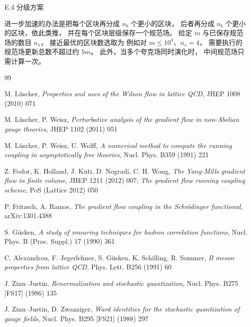 \lussubsec E.4 分级方案

进一步加速的办法是把每个区块再分成 $n_b$ 个更小的区块，
后者再分成 $n_b$ 个更小的区块，依此类推，
并在每个区块层级保存一个规范场。
给定 $m$ 与已保存规范场的数目 $n_s$，
接近最优的区块数选取为
例如对 $m\leq10^3$、$n_s=4$，
需要执行的规范场更新总数不超过约 $5m$。
此外，当多个夸克场同时演化时，
中间规范场只需计算一次。

\begin{thebibliography}{99}




M. L\"uscher,
{\it Properties and uses of the Wilson flow in lattice QCD},
JHEP 1008 (2010) 071



M. L\"uscher, P. Weisz,
{\it Perturbative analysis of the gradient flow in non-Abelian gauge
theories},
JHEP 1102 (2011) 051



M. L\"uscher, P. Weisz, U. Wolff,
{\it A numerical method to compute the running coupling in asymptotically 
free theories},
Nucl. Phys. B359 (1991) 221

Z. Fodor, K. Holland, J. Kuti, D. Nogradi, C. H. Wong,
{\it The Yang-Mills gradient flow in finite volume},
JHEP 1211 (2012) 007; {\it The gradient flow running coupling scheme},
PoS (Lattice 2012) 050

P. Fritzsch, A. Ramos,
{\it The gradient flow coupling in the Schr\"odinger functional},
arXiv:1301.4388



S. G\"usken,
{\it A study of smearing techniques for hadron correlation functions},
Nucl. Phys. B (Proc. Suppl.) 17 (1990) 361

C. Alexandrou, F. Jegerlehner, S. G\"usken, K. Schilling, R. Sommer,
{\it B meson properties from lattice QCD},
Phys. Lett. B256 (1991) 60



J. Zinn--Justin,
{\it Renormalization and stochastic quantization},
Nucl. Phys. B275 [FS17] (1986) 135

J. Zinn--Justin, D. Zwanziger, 
{\it Ward identities for the stochastic quantization of gauge fields},
Nucl. Phys. B295 [FS21] (1988) 297



\end{thebibliography}
